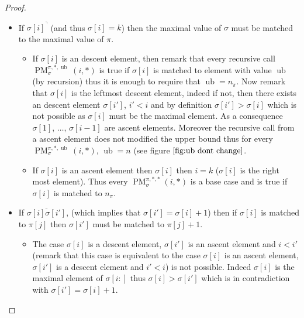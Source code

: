 \documentclass[a4paper]{llncs}
\newcommand{\ptext}{\pi}
\newcommand{\ppattern}{\sigma}
\DeclareMathOperator{\PMa}{PM}
\newcommand{\PM}[6]{\PMa_{{#1}}^{{#2},{#3},{#4}}({#5},{#6})}
\DeclareMathOperator{\ub}{ub}
\begin{document}
\begin{proof}
\begin{itemize}
\begin{itemize}
	\end{itemize}




	\item If ${\ppattern[i]}^\urcorner$ (and thus $\sigma[i]=k$) then the maximal value of $\ppattern$ must be matched to the maximal value of $\ptext$.
	\begin{itemize}

		\item If $\sigma[i]$ is an descent element, then remark that 
		every recursive call \\ $\PM{\sigma}{\ptext}{*}{\ub}{i}{*}$ is true if $\sigma[i]$ is matched to element with value $\ub$ (by recursion) thus it is enough to require that $\ub=n_{\ptext}$.
		Now remark that $\sigma[i]$ is the leftmost descent element, indeed if not, then there exists an descent element $\sigma[i']$, $i'<i$ and by definition $\sigma[i']>\sigma[i]$ which is not possible as $\sigma[i]$ must be the maximal element.
		As a consequence $\sigma[1]$, $\ldots$, $\sigma[i-1]$ are ascent elements.
		Moreover the recursive call from a ascent element does not modified the upper bound
		thus for every $\PM{\sigma}{\ptext}{*}{\ub}{i}{*}$, $\ub=n$ (see figure $\ref{fig:ub dont change}$. 	
		
		
		\item If $\sigma[i]$ is an ascent element then $\sigma[i]$ then $i=k$ ($\sigma[i]$ is the right most element). Thus every $\PM{\sigma}{\ptext}{*}{*}{i}{*}$ is a base case and is true if $\sigma[i]$ is matched to $n_{\ptext}$.

	\end{itemize}



	\item  If $\overline{\ppattern[i]\ppattern[i']}$,  (which implies that $\ppattern[i']=\ppattern[i]+1$) then if $\ppattern[i]$ is matched to $\ptext[j]$ then $\ppattern[i']$ must be matched to $\ptext[j]+1$.

		\begin{itemize}

			\item The case $\ppattern[i]$ is a descent element, $\ppattern[i']$ is an ascent element and $i<i'$ (remark that this case is equivalent to the case $\ppattern[i]$ is an ascent element, $\ppattern[i']$ is a descent element and $i'<i$) is not possible. 
			Indeed $\ppattern[i]$ is the maximal element of $\ppattern[i:]$ thus $\ppattern[i] > \ppattern[i']$ which is in contradiction with 
			$\ppattern[i']=\ppattern[i]+1$. 
			

\end{itemize}
\end{itemize}
\end{proof}
\end{document}
